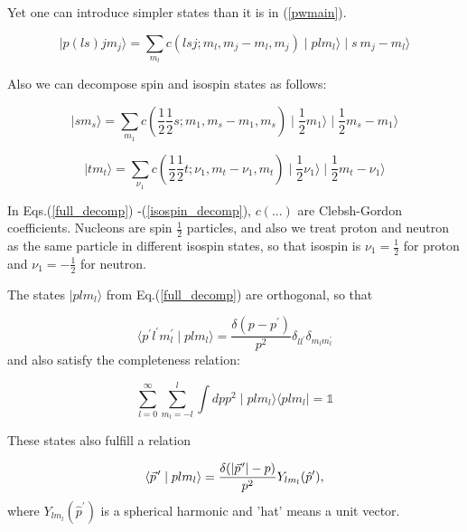     Yet one can introduce simpler states than it is in (\ref{pwmain}).
    
    \begin{equation}
        \mid p (ls) j m_j \rangle = \sum_{m_l} c(lsj;m_l, m_j\!-\!m_l, m_j) \mid p l m_l \rangle
        \mid s~m_j\!-\!m_l \rangle
        \label{full_decomp}
    \end{equation}

    Also we can decompose spin and isospin states as follows:

    \begin{equation}
        \mid s m_s \rangle = \sum_{m_1} c(\frac{1}{2}\frac{1}{2}s;m_1, m_s\!-\!m_1, m_s)
        \mid \frac{1}{2} m_1 \rangle
        \mid \frac{1}{2} m_s\!-\!m_1 \rangle
        \label{spin_decomp}
    \end{equation}

    \begin{equation}
        \mid t m_t \rangle = \sum_{\nu_1} c(\frac{1}{2}\frac{1}{2}t;\nu_1, m_t\!-\!\nu_1, m_t)
        \mid \frac{1}{2} \nu_1 \rangle
        \mid \frac{1}{2} m_t\!-\!\nu_1 \rangle
        \label{isospin_decomp}
    \end{equation}

    In Eqs.(\ref{full_decomp}) -(\ref{isospin_decomp}),  $c(...)$ are Clebsh-Gordon coefficients.
    Nucleons are spin $\frac{1}{2}$ particles, and also we treat proton and neutron as 
    the same particle in different 
    isospin states, so that isospin is $\nu_1 = \frac{1}{2}$ for proton and $\nu_1 = -\frac{1}{2}$ for neutron.

    The states $\mid p l m_l \rangle$ from Eq.(\ref{full_decomp}) are orthogonal, so that
    
    \begin{equation}
        \langle p^\prime l^\prime m_l^\prime \mid p l m_l \rangle = 
        \frac{\delta(p - p^\prime)}{p^2} \delta_{ll^\prime}\delta_{m_l m_l^\prime}
    \end{equation}
    and also satisfy the completeness relation:

    \begin{equation}
        \sum_{l=0}^\infty \sum_{m_l=-l}^l \int dp p^2 \mid plm_l \rangle \langle plm_l \mid = \mathbb{1}
    \end{equation}


    These states also fulfill a relation

    \begin{equation}
        \langle \pvec{p} \mid plm_l \rangle = 
        \frac{\delta ( \abs{\pvec{p}} - p)}{p^2} Y _{l m_l}(\hat{p}^\prime),
    \end{equation}
    where $Y _{l m_l}(\hat{p}^\prime)$ is a spherical harmonic and 'hat' means a unit vector.

